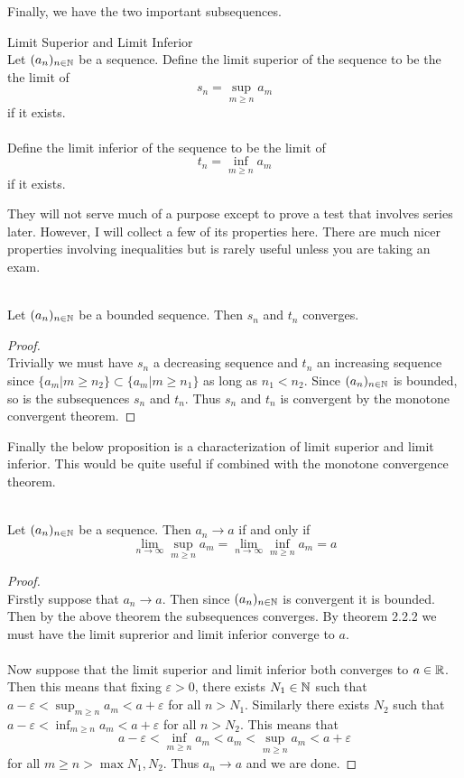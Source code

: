 \documentclass[a4paper]{article}
\begin{document}
Finally, we have the two important subsequences. 

\begin{defn}{Limit Superior and Limit Inferior}{}\\ Let $(a_n)_{n\in\mathbb{N}}$ be a sequence. Define the limit superior of the sequence to be the the limit of $$s_n=\sup_{m\geq n}a_m$$ if it exists. \\~\\ Define the limit inferior of the sequence to be the limit of $$t_n=\inf_{m\geq n}a_m$$ if it exists. 
\end{defn}

They will not serve much of a purpose except to prove a test that involves series later. However, I will collect a few of its properties here. There are much nicer properties involving inequalities but is rarely useful unless you are taking an exam. 

\begin{prp}{}{}\\ Let $(a_n)_{n\in\mathbb{N}}$ be a bounded sequence. Then $s_n$ and $t_n$ converges. 
\begin{proof}\\
Trivially we must have $s_n$ a decreasing sequence and $t_n$ an increasing sequence since $\{a_m|m\geq n_2\}\subset\{a_m|m\geq n_1\}$ as long as $n_1<n_2$. Since $(a_n)_{n\in\mathbb{N}}$ is bounded, so is the subsequences $s_n$ and $t_n$. Thus $s_n$ and $t_n$ is convergent by the monotone convergent theorem. 
\end{proof}
\end{prp}

Finally the below proposition is a characterization of limit superior and limit inferior. This would be quite useful if combined with the monotone convergence theorem. 

\begin{prp}{}{}\\ Let $(a_n)_{n\in\mathbb{N}}$ be a sequence. Then $a_n\to a$ if and only if $$\lim_{n\to\infty}\sup_{m\geq n}a_m=\lim_{n\to\infty}\inf_{m\geq n}a_m=a$$ 
\begin{proof}\\
Firstly suppose that $a_n\to a$. Then since $(a_n)_{n\in\mathbb{N}}$ is convergent it is bounded. Then by the above theorem the subsequences converges. By theorem 2.2.2 we must have the limit suprerior and limit inferior converge to $a$. \\~\\
Now suppose that the limit superior and limit inferior both converges to $a\in\mathbb{R}$. Then this means that fixing $\varepsilon>0$, there exists $N_1\in\mathbb{N}$ such that $a-\varepsilon<\sup_{m\geq n}a_m<a+\varepsilon$ for all $n>N_1$. Similarly there exists $N_2$ such that $a-\varepsilon<\inf_{m\geq n}a_m<a+\varepsilon$ for all $n>N_2$. This means that $$a-\varepsilon<\inf_{m\geq n}a_m<a_m<\sup_{m\geq n}a_m<a+\varepsilon$$ for all $m\geq n>\max{N_1,N_2}$. Thus $a_n\to a$ and we are done. 
\end{proof}
\end{prp}
\end{document}
